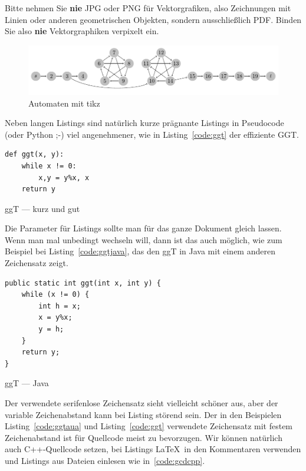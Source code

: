 \documentclass[11pt,a4paper]{report}
\begin{document}
Bitte nehmen Sie \textbf{nie} JPG oder PNG für Vektorgrafiken, 
also Zeichnungen mit Linien oder anderen geometrischen Objekten,
sondern ausschließlich PDF.
Binden Sie also \textbf{nie} Vektorgraphiken verpixelt ein.


\begin{figure}[htb]
\centering
\includegraphics[width=.9\textwidth]{automata.pdf}
\caption{Automaten mit tikz~\cite{tikzautomata}}
\label{fig:tikz}
\end{figure}


Neben langen Listings sind natürlich kurze prägnante
Listings in Pseudocode (oder Python ;-) viel 
angenehmener, wie in Listing~\ref{code:ggt} der
effiziente GGT.

\begin{listing}[htbp]
\begin{lstlisting}
def ggt(x, y):
    while x != 0:
        x,y = y%x, x
    return y
\end{lstlisting}
\caption{ggT --- kurz und gut}
\label{code:ggt}
\end{listing}

Die Parameter für Listings sollte man für das ganze Dokument gleich 
lassen. 
Wenn man mal unbedingt wechseln will, dann ist das auch möglich,
wie zum Beispiel bei Listing~\ref{code:ggtjava}, das den ggT
in Java mit einem anderen Zeichensatz zeigt.

\begin{listing}[htbp]
\lstset{basicstyle=\sffamily, columns=[l]flexible, mathescape=true, showstringspaces=true, numbers=none, language=java}
\begin{lstlisting}
public static int ggt(int x, int y) {
    while (x != 0) {
        int h = x;
        x = y%x;
        y = h;
    }
    return y;
}
\end{lstlisting}
\caption{ggT --- Java}
\label{code:ggtjava}
\end{listing}

Der verwendete serifenlose Zeichensatz sieht vielleicht schöner 
aus, aber der variable Zeichenabstand kann bei Listing störend 
sein. Der in den Beispielen Listing~\ref{code:ggtaua} und 
Listing~\ref{code:ggt} verwendete Zeichensatz mit festem
Zeichenabstand ist für Quellcode meist zu bevorzugen.
Wir können natürlich auch C++-Quellcode setzen, bei Listings
\LaTeX\ in den Kommentaren verwenden und Listings aus
Dateien einlesen wie in~\ref{code:gcdcpp}.
\end{document}
